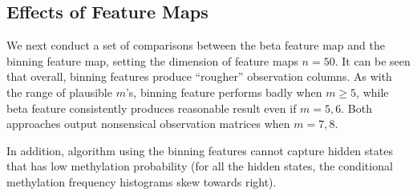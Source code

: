 \documentclass{article}
\begin{document}
\subsection{Effects of Feature Maps}
We next conduct a set of comparisons between the beta feature map and the binning
feature map, setting the dimension of feature maps $n = 50$.
It can be seen that overall, binning features produce ``rougher''
observation columns. As with the range of plausible $m$'s, binning feature performs
badly when $m \geq 5$, while beta feature consistently produces reasonable result
even if $m = 5,6$. Both approaches output nonsensical observation matrices when
$m = 7, 8$.

In addition, algorithm using the binning features cannot capture hidden states that has
low methylation probability (for all the hidden states, the conditional
methylation frequency histograms skew towards right).
\end{document}
